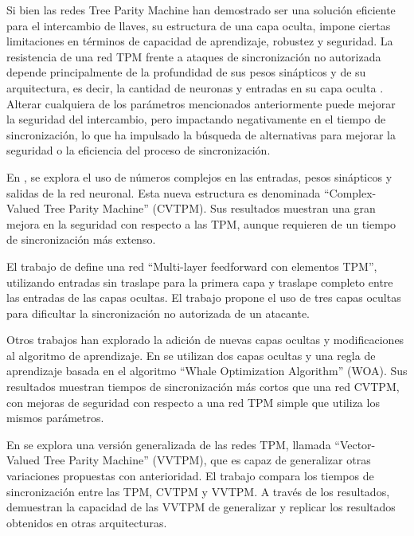 Si bien las redes Tree Parity Machine han demostrado ser una solución eficiente para el intercambio de llaves, su estructura de una capa oculta, impone ciertas limitaciones en términos de capacidad de aprendizaje, robustez y seguridad. La resistencia de una red TPM frente a ataques de sincronización no autorizada depende principalmente de la profundidad de sus pesos sinápticos y de su arquitectura, es decir, la cantidad de neuronas y entradas en su capa oculta \cite{ruttorDynamicsNeuralCryptography2007}. Alterar cualquiera de los parámetros mencionados anteriormente puede mejorar la seguridad del intercambio, pero impactando negativamente en el tiempo de sincronización, lo que ha impulsado la búsqueda de alternativas para mejorar la seguridad o la eficiencia del proceso de sincronización.

En \cite{dongNeuralCryptographyBased2020}, se explora el uso de números complejos en las entradas, pesos sinápticos y salidas de la red neuronal. Esta nueva estructura es denominada “Complex-Valued Tree Parity Machine” (CVTPM). Sus resultados muestran una gran mejora en la seguridad con respecto a las TPM, aunque requieren de un tiempo de sincronización más extenso.

El trabajo de \cite{shishniashviliEnhancingIoTSecurity2020} define una red “Multi-layer feedforward con elementos TPM”, utilizando entradas sin traslape para la primera capa y traslape completo entre las entradas de las capas ocultas. El trabajo propone el uso de tres capas ocultas para dificultar la sincronización no autorizada de un atacante.  

Otros trabajos han explorado la adición de nuevas capas ocultas y modificaciones al algoritmo de aprendizaje. En \cite{sarkarArtificialNeuralSynchronization2021} se utilizan dos capas ocultas y una regla de aprendizaje basada en el algoritmo “Whale Optimization Algorithm” (WOA). Sus resultados muestran tiempos de sincronización más cortos que una red CVTPM, con mejoras de seguridad con respecto a una red TPM simple que utiliza los mismos parámetros.

En \cite{jeongNeuralCryptographyBased2021} se explora una versión generalizada de las redes TPM, llamada “Vector-Valued Tree Parity Machine” (VVTPM), que es capaz de generalizar otras variaciones propuestas con anterioridad. El trabajo compara los tiempos de sincronización entre las TPM, CVTPM y VVTPM. A través de los resultados, demuestran la capacidad de las VVTPM de generalizar y replicar los resultados obtenidos en otras arquitecturas.

